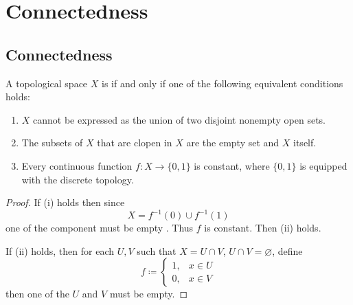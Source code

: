 \documentclass[../main.tex]{subfiles}
\begin{document}
\ifSubfilesClassLoaded{

    
}{}

\chapter{ Connectedness }

\section{Connectedness}

\begin{definition}{}{}
A topological space $X$ is  if and only if one of the following equivalent conditions holds:
\begin{enumerate}
    \item[(i)] $X$ cannot be expressed as the union of two disjoint nonempty open sets.
    \item[(ii)]  The subsets of \(  X  \) that are clopen in \(  X  \) are the empty set and \(  X  \) itself.   
    \item[(iii)] Every continuous function $f: X \to \{0, 1\}$ is constant, where $\{0, 1\}$ is equipped with the discrete topology.
\end{enumerate}
\end{definition}

\begin{proof}
    If (i) holds then since \[
    X= f^{-1} \left( 0 \right)\cup f^{-1} \left( 1 \right)  
    \] one of the component must be  empty     . Thus \(  f  \) is constant. Then (ii) holds.
    
    If (ii) holds, then for each \(  U,V   \) such that \(  X= U\cap V  \), \(  U\cap V= \varnothing  \), define \[
    f\coloneqq \begin{cases} 1,&x\in U\\ 
     0,& x\in V \end{cases} 
    \] then one of the \(  U  \) and \(  V  \) must be empty.     
\end{proof}
\end{document}
